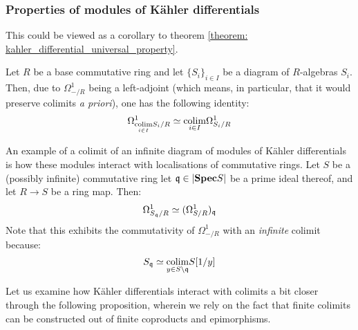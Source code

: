             \subsubsection{Properties of modules of K\"ahler differentials}
                \begin{remark} \label{remark: differentials_and_colimits}
                    This could be viewed as a corollary to theorem \ref{theorem: kahler_differential_universal_property}. 
                    
                    Let $R$ be a base commutative ring and let $\{S_i\}_{i \in I}$ be a diagram of $R$-algebras $S_i$. Then, due to $\Omega^1_{-/R}$ being a left-adjoint (which means, in particular, that it would preserve colimits \textit{a priori}), one has the following identity:
                        $$\Omega^1_{\underset{i \in I}{\operatorname{colim}} S_i/R} \simeq \underset{i \in I}{\operatorname{colim}} \Omega^1_{S_i/R}$$
                \end{remark}
                \begin{example} \label{example: kahler_differentials_and_localisations}
                    An example of a colimit of an infinite diagram of modules of K\"ahler differentials is how these modules interact with localisations of commutative rings. Let $S$ be a (possibly infinite) commutative ring let $\mathfrak{q} \in |\mathbf{Spec} S|$ be a prime ideal thereof, and let $R \to S$ be a ring map. Then:
                        $$\Omega^1_{S_{\mathfrak{q}}/R} \simeq (\Omega^1_{S/R})_{\mathfrak{q}}$$
                    Note that this exhibits the commutativity of $\Omega^1_{-/R}$ with an \textit{infinite} colimit because:
                        $$S_{\mathfrak{q}} \simeq \underset{y \in S \setminus \mathfrak{q}}{\operatorname{colim}} S[1/y]$$
                \end{example}
                Let us examine how K\"ahler differentials interact with colimits a bit closer through the following proposition, wherein we rely on the fact that finite colimits can be constructed out of finite coproducts and epimorphisms.
